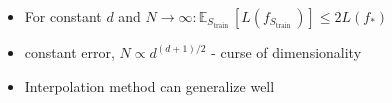 

\begin{itemize}
    \item For constant $d$ and $N \rightarrow \infty: \mathbb{E}_{S_{\text {train }}}\left[L\left(f_{S_{\text {train }}}\right)\right] \leq 2 L\left(f_{*}\right)$
    \item constant error, $N \propto d^{(d+1) / 2}$ - curse of dimensionality
    \item Interpolation method can generalize well
\end{itemize}








